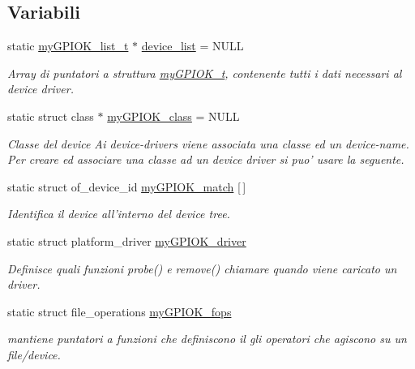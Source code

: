 \subsection*{Variabili}
\begin{DoxyCompactItemize}
\item 
static \hyperlink{structmy_g_p_i_o_k__list__t}{my\+G\+P\+I\+O\+K\+\_\+list\+\_\+t} $\ast$ \hyperlink{group___linux-_driver_ga1deed297d5c8afeb9703965d37d3be5b}{device\+\_\+list} = N\+U\+L\+L
\begin{DoxyCompactList}\small\item\em Array di puntatori a struttura \hyperlink{structmy_g_p_i_o_k__t}{my\+G\+P\+I\+O\+K\+\_\+t}, contenente tutti i dati necessari al device driver. \end{DoxyCompactList}\item 
static struct class $\ast$ \hyperlink{group___linux-_driver_gaaf8d1bce7d6389684a037e94381c275c}{my\+G\+P\+I\+O\+K\+\_\+class} = N\+U\+L\+L
\begin{DoxyCompactList}\small\item\em Classe del device Ai device-\/drivers viene associata una classe ed un device-\/name. Per creare ed associare una classe ad un device driver si puo' usare la seguente. \end{DoxyCompactList}\item 
static struct of\+\_\+device\+\_\+id \hyperlink{group___linux-_driver_gab59f49dc0fe8d885c73752b8a8163d0e}{my\+G\+P\+I\+O\+K\+\_\+match} \mbox{[}$\,$\mbox{]}
\begin{DoxyCompactList}\small\item\em Identifica il device all'interno del device tree. \end{DoxyCompactList}\item 
static struct platform\+\_\+driver \hyperlink{group___linux-_driver_ga8dba1541b58fa63f8208232ffce4fc47}{my\+G\+P\+I\+O\+K\+\_\+driver}
\begin{DoxyCompactList}\small\item\em Definisce quali funzioni probe() e remove() chiamare quando viene caricato un driver. \end{DoxyCompactList}\item 
static struct file\+\_\+operations \hyperlink{group___linux-_driver_gad1963bc01fffdbb315a408a9210cbafc}{my\+G\+P\+I\+O\+K\+\_\+fops}
\begin{DoxyCompactList}\small\item\em mantiene puntatori a funzioni che definiscono il gli operatori che agiscono su un file/device. \end{DoxyCompactList}\end{DoxyCompactItemize}


